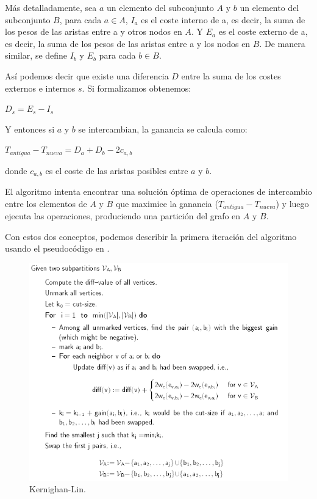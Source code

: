 Más detalladamente, sea $a$ un elemento del subconjunto $A$ y $b$ un elemento del subconjunto $B$, para cada $a \in A$, $I_{a}$ es el coste interno de a, es decir, la suma de los pesos de las aristas entre a y otros nodos en $A$. Y $E_{a}$ es el coste externo de a, es decir, la suma de los pesos de las aristas entre a y los nodos en $B$. De manera similar, se define $I_{b}$ y $E_{b}$ para cada $b \in B$.

Así podemos decir que existe una diferencia $D$ entre la suma de los costes externos e internos $s$. Si formalizamos obtenemos:

\begin{center}
	$D_{s} = E_{s} - I_{s}$
\end{center}

Y entonces si $a$ y $b$ se intercambian, la ganancia se calcula como:

\begin{center}\label{ganancia}
	$T_{antigua} - T_{nueva} = D_{a} + D_{b} - 2c_{a, b}$ 
\end{center}

donde $c_{a, b}$ es el coste de las aristas posibles entre $a$ y $b$.

El algoritmo intenta encontrar una solución óptima de operaciones de intercambio entre los elementos de $A$ y $B$ que maximice la ganancia ($T_{antigua} - T_{nueva}$) y luego ejecuta las operaciones, produciendo una partición del grafo en $A$ y $B$.

Con estos dos conceptos, podemos describir la primera iteración del algoritmo usando el pseudocódigo en \cite{Ravikumar}.

\begin{figure}[h]
	\centering
	\includegraphics[scale=0.8]{Figures/kl_pseudocode}
	\vspace{1mm}
	\caption{Kernighan-Lin.}
	\label{kl_pseudocode}
\end{figure}

